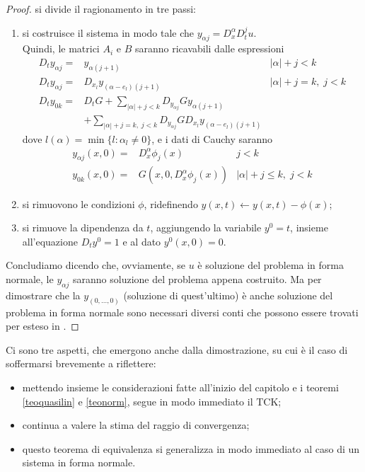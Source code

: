 \begin{proof}
si divide il ragionamento in tre passi:
\begin{enumerate}
\item si costruisce il sistema in modo tale che $y_{\alpha j}= D^\alpha_x D^j_t u$. \\
Quindi, le matrici $A_i$ e $B$ saranno ricavabili dalle espressioni
\begin{align*}
D_t y_{\alpha j} =& y_{\alpha (j+1)} & |\alpha| + j < k \\
D_t y_{\alpha j} =& D_{x_l} y_{(\alpha-e_l)(j+1)} & |\alpha| + j = k, \; j < k\\
D_t y_{0k} =& D_tG + \sum_{|\alpha|+j < k} D_{y_{\alpha j}}G y_{\alpha (j+1)} \\
& + \sum_{|\alpha|+j = k, \; j < k} D_{y_{\alpha j}} G D_{x_l} y_{(\alpha-e_l)(j+1)}
\end{align*}
dove $l(\alpha)=\min\{ l:\alpha_l\neq 0 \} $, e i dati di Cauchy saranno
\begin{align*}
y_{\alpha j}(x, 0) = & D_x^{\alpha} \phi_j(x) & j < k\\
y_{0k}(x, 0) = & G\left( x, 0, D_x^{\alpha} \phi_j(x) \right) & \lvert \alpha \rvert + j \leq k, \; j < k
\end{align*}
\item si rimuovono le condizioni $\phi$, ridefinendo $y(x,t)\leftarrow y(x,t)-\phi (x)$;
\item si rimuove la dipendenza da $t$, aggiungendo la variabile $y^0=t$, insieme all'equazione $D_t y^0=1$ e al dato $y^0(x,0)=0$.
\end{enumerate}
Concludiamo dicendo che, ovviamente, se $u$ è soluzione del problema in forma normale, le $y_{\alpha j}$ saranno soluzione del problema appena costruito. Ma per dimostrare che la $y_{(0,\ldots,0)}$ (soluzione di quest'ultimo) è anche soluzione del problema in forma normale sono necessari diversi conti che possono essere trovati per esteso in \cite[cap.1]{Folland}.
\end{proof}

\begin{remark}
Ci sono tre aspetti, che emergono anche dalla dimostrazione, su cui è il caso di soffermarsi brevemente a riflettere:
\begin{itemize}
\item mettendo insieme le considerazioni fatte all'inizio del capitolo e i teoremi \ref{teoquasilin} e \ref{teonorm}, segue in modo immediato il TCK;
\item continua a valere la stima del raggio di convergenza;
\item questo teorema di equivalenza si generalizza in modo immediato al caso di un sistema in forma normale.
\end{itemize}
\end{remark}








